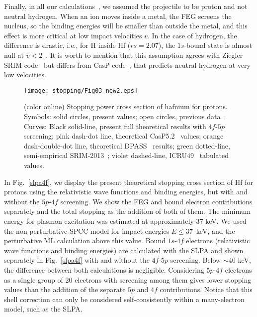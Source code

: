 Finally, in all our calculations~\cite{mon17}, we assumed the projectile 
to be proton and not neutral hydrogen. When an ion moves inside a metal, 
the FEG screens the nucleus, so the binding energies will be smaller 
than outside the metal, and this effect is more critical at low impact 
velocities $v$. In the case of hydrogen, the difference is drastic, 
i.e., for H inside Hf ($rs=2.07$), the $1s$-bound state is almost null at 
$v<2$~\cite{suppression}. It is worth to mention that this assumption 
agrees with Ziegler SRIM code~\cite{Ziegler01} but differs from CasP 
code~\cite{Grande}, that predicts neutral hydrogen at very low velocities.

\begin{figure*}[!t]
\centering
\texttt{[image: stopping/Fig03\_new2.eps]}
\caption{(color online) Stopping power cross section of hafnium for 
protons. Symbols: solid circles, present values; open circles, previous 
data~\cite{Sirotinin}. Curves: 
Black solid-line, present full theoretical results with $4f$-$5p$ screening; 
pink dash-dot line, theoretical CasP5.2~\cite{Grande,casp52} values; 
orange dash-double-dot line, theoretical DPASS~\cite{DPASS20} results; 
green dotted-line, semi-empirical SRIM-2013~\cite{Ziegler01}; 
violet dashed-line, ICRU49~\cite{ICRU49} tabulated values.}
\label{F03}
\end{figure*}

In Fig.~\ref{slpa4f}, we display the present theoretical stopping cross
section of Hf for protons using the relativistic wave functions 
and binding energies, but with and without the $5p$-$4f$ screening. 
We show the FEG and bound electron contributions separately and the 
total stopping as the addition of both of them. The minimum energy for 
plasmon excitation was estimated at approximately $37$ keV. We used the 
non-perturbative SPCC model for impact energies $E \leq 37$~keV, and the 
perturbative ML calculation above this value. Bound $1s$-$4f$ electrons 
(relativistic wave functions and binding energies) are calculated with 
the SLPA and shown separately in Fig.~\ref{slpa4f} with and without the 
$4f$-$5p$ screening. Below $\sim 40$ keV, the difference between both 
calculations is negligible. Considering $5p$-$4f$ electrons 
as a single group of 20 electrons with screening among them gives lower 
stopping values than the addition of the separate $5p$ and $4f$ 
contributions. Notice that this shell correction can only be considered self-consistently within a many-electron model, such as the SLPA.

